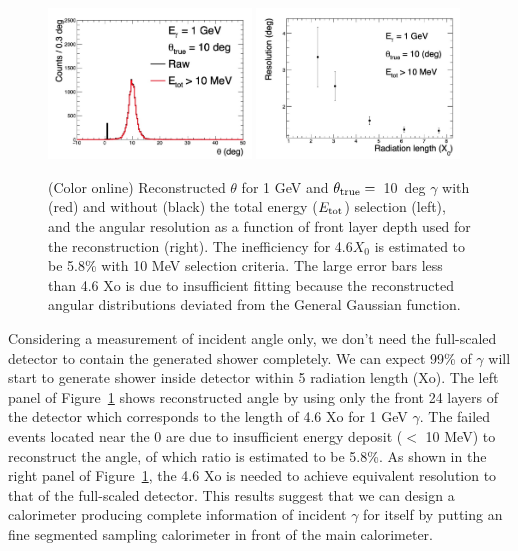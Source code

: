 \documentclass[jkps,preprint,fleqn,showpacs,showkeys]{revtex4}
\begin{document}
\begin{figure}[!hbt]
\includegraphics[width=0.48\textwidth]{figures/res_Nlayer.jpg}
\includegraphics[width=0.48\textwidth]{figures/resol_Nlayer.jpg}
\caption{ (Color online) Reconstructed $\theta$ for 1 GeV and $\theta_{\rm{true}}=$~10~deg $\gamma$ with (red) and without (black) the total energy ($E_{\rm{tot}}$) selection (left), and the angular resolution as a function of front layer depth used for the reconstruction (right). The inefficiency for 4.6$X_{0}$ is estimated to be 5.8\% with 10 MeV selection criteria. The large error bars less than 4.6 Xo is due to insufficient fitting because the reconstructed angular distributions deviated from the General Gaussian function. }
\label{fig:angle_reco_layer}
\end{figure}

Considering a measurement of incident angle only, we don't need the full-scaled detector to contain the generated shower completely. We can expect 99\% of $\gamma$ will start to generate shower inside detector within 5 radiation length (Xo). The left panel of Figure~\ref{fig:angle_reco_layer} shows reconstructed angle by using only the front 24 layers of the detector which corresponds to the length of 4.6 Xo for 1 GeV $\gamma$. The failed events located near the 0 are due to insufficient energy deposit ($<$ 10 MeV) to reconstruct the angle, of which ratio is estimated to be 5.8\%. As shown in the right panel of Figure~\ref{fig:angle_reco_layer}, the 4.6 Xo is needed to achieve equivalent resolution to that of the full-scaled detector. This results suggest that we can design a calorimeter producing complete information of incident $\gamma$ for itself by putting an fine segmented sampling calorimeter in front of the main calorimeter.
\end{document}
